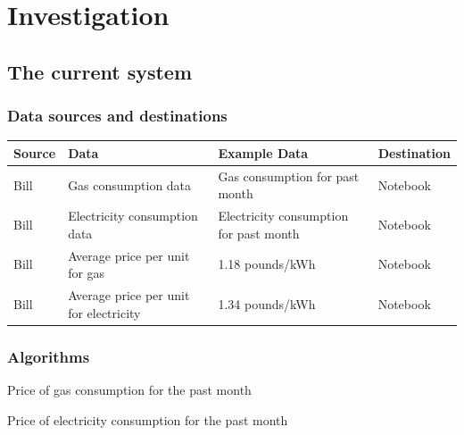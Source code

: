 \section{Investigation}

\subsection{The current system}

\subsubsection{Data sources and destinations}
\begin{center}
\begin{tabular}{|l|l|p{4cm}|l|}
	\hline
	\textbf{Source} & \textbf{Data} & \textbf{Example Data} & \textbf{Destination} \\ \hline
	Bill & Gas consumption data & Gas consumption for past month & Notebook \\ \hline
	Bill & Electricity consumption data & Electricity consumption for past month & Notebook \\ \hline
	Bill & Average price per unit for gas & 1.18 pounds/kWh & Notebook \\ \hline
 	Bill & Average price per unit for electricity & 1.34 pounds/kWh & Notebook \\ \hline
\end{tabular}
\label{tab:Data sources and destinations for the current system}
\end{center}

\subsubsection{Algorithms}
\begin{algorithm}[H]
	\caption{Price of gas consumption for the past month}
\begin{algorithmic}[H]
\end{algorithmic}
\end{algorithm}

\begin{algorithm}[H]
	\caption{Price of electricity consumption for the past month}
\begin{algorithmic}[H]
\end{algorithmic}
\end{algorithm}

